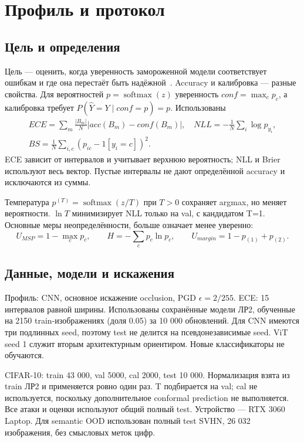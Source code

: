 \section{Профиль и протокол}
\subsection{Цель и определения}
Цель --- оценить, когда уверенность замороженной модели соответствует ошибкам и где она перестаёт быть надёжной~\cite{teacher}. Accuracy и калибровка --- разные свойства. Для вероятностей $p=\operatorname{softmax}(z)$ уверенность $conf=\max_cp_c$, а калибровка требует $P(\hat Y=Y\mid conf=p)=p$. Использованы
\begin{equation}\begin{aligned}ECE=\sum_m\frac{|B_m|}{N}|acc(B_m)-conf(B_m)|,\quad NLL=-\frac1N\sum_i\log p_{y_i},\\ BS=\frac1N\sum_{i,c}(p_{ic}-1[y_i=c])^2.\end{aligned}\end{equation}
ECE зависит от интервалов и учитывает верхнюю вероятность; NLL и Brier используют весь вектор. Пустые интервалы не дают определённой accuracy и исключаются из суммы.

Температура $p^{(T)}=\operatorname{softmax}(z/T)$ при $T>0$ сохраняет argmax, но меняет вероятности. $\ln T$ минимизирует NLL только на val, с кандидатом T=1. Основные меры неопределённости, больше означает менее уверенно:
\begin{equation}U_{MSP}=1-\max_cp_c,\qquad H=-\sum_cp_c\ln p_c,\qquad U_{margin}=1-p_{(1)}+p_{(2)}.\end{equation}

\subsection{Данные, модели и искажения}
Профиль: CNN, основное искажение occlusion, PGD $\epsilon=2/255$. ECE: 15 интервалов равной ширины. Использованы сохранённые модели ЛР2, обученные на 2150 train-изображениях (доля 0.05) за 10 000 обновлений. Для CNN имеются три подлинных seed, поэтому test не делится на псевдонезависимые seed. ViT seed 1 служит вторым архитектурным ориентиром. Новые классификаторы не обучаются.


CIFAR-10: train 43 000, val 5000, cal 2000, test 10 000. Нормализация взята из train ЛР2 и применяется ровно один раз. T подбирается на val; cal не используется, поскольку дополнительное conformal prediction не выполняется. Все атаки и оценки используют общий полный test. Устройство --- RTX 3060 Laptop. Для semantic OOD использован полный test SVHN, 26 032 изображения, без смысловых меток цифр.

